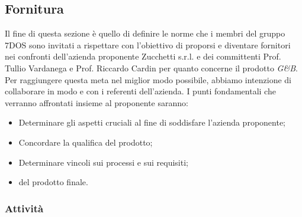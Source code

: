 \subsection{Fornitura}
Il fine di questa sezione è quello di definire le norme che i membri del gruppo 7DOS sono invitati a rispettare con l'obiettivo di proporsi e diventare fornitori nei confronti dell'azienda proponente Zucchetti s.r.l. e dei committenti Prof. Tullio Vardanega e Prof. Riccardo Cardin per quanto concerne il prodotto \emph{G\&B}.
Per raggiungere questa meta nel miglior modo possibile, abbiamo intenzione di collaborare in modo  e  con i referenti dell'azienda.
I punti fondamentali che verranno affrontati insieme al proponente saranno:
\begin{itemize}
\item Determinare gli aspetti cruciali al fine di soddisfare l'azienda proponente;
\item Concordare la qualifica del prodotto;
\item Determinare vincoli sui processi e sui requisiti;
\item {} del prodotto finale.
\end{itemize}
\subsubsection{Attività}
